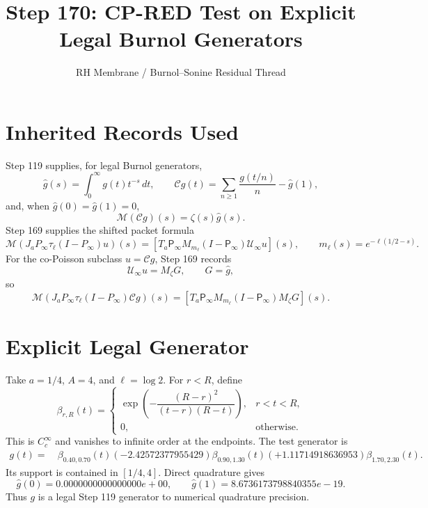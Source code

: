 \documentclass[11pt]{article}
\title{Step 170: CP-RED Test on Explicit Legal Burnol Generators}
\author{RH Membrane / Burnol--Sonine Residual Thread}
\date{}
\newcommand{\Chat}{\mathcal C}
\newcommand{\Mell}{\mathcal M}
\newcommand{\Pinfty}{P_\infty}
\newcommand{\Pinfm}{\mathsf P_\infty}
\newcommand{\Uinf}{\mathcal U_\infty}
\begin{document}
\maketitle

\section{Inherited Records Used}
Step 119 supplies, for legal Burnol generators,
\[
  \widehat g(s)=\int_0^\infty g(t)t^{-s}\,dt,\qquad
  \Chat g(t)=\sum_{n\ge1}\frac{g(t/n)}n-\widehat g(1),
\]
and, when \(\widehat g(0)=\widehat g(1)=0\),
\[
  \Mell(\Chat g)(s)=\zeta(s)\widehat g(s).
\]
Step 169 supplies the shifted packet formula
\[
  \Mell(J_a\Pinfty\tau_\ell(I-\Pinfty)u)(s)
  =
  [T_a\Pinfm M_{m_\ell}(I-\Pinfm)\Uinf u](s),
  \qquad m_\ell(s)=e^{-\ell(1/2-s)}.
\]
For the co-Poisson subclass \(u=\Chat g\), Step 169 records
\[
  \Uinf u = M_\zeta G,\qquad G=\widehat g,
\]
so
\[
  \Mell(J_a\Pinfty\tau_\ell(I-\Pinfty)\Chat g)(s)
  =
  [T_a\Pinfm M_{m_\ell}(I-\Pinfm)M_\zeta G](s).
\]

\section{Explicit Legal Generator}
Take \(a=1/4\), \(A=4\), and \(\ell=\log 2\).  For \(r<R\), define
\[
  \beta_{r,R}(t)=
  \begin{cases}
  \exp\!\left(-\dfrac{(R-r)^2}{(t-r)(R-t)}\right),& r<t<R,\\
  0,&\text{otherwise.}
  \end{cases}
\]
This is \(C_c^\infty\) and vanishes to infinite order at the endpoints.  The
test generator is
\[
\begin{aligned}
g(t)=&\ \beta_{0.40,0.70}(t)
(-2.42572377955429)\beta_{0.90,1.30}(t)
(+1.11714918636953)\beta_{1.70,2.30}(t).
\end{aligned}
\]
Its support is contained in \([1/4,4]\).  Direct quadrature gives
\[
  \widehat g(0)=0.0000000000000000e+00,\qquad
  \widehat g(1)=8.6736173798840355e-19.
\]
Thus \(g\) is a legal Step 119 generator to numerical quadrature precision.
\end{document}
